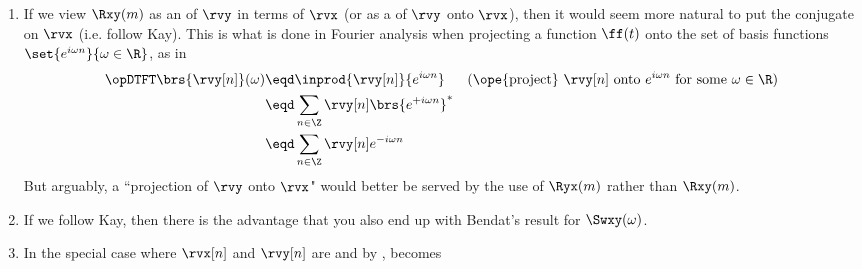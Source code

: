 \begin{remark}
\begin{enumerate}
\item If we view $\Rxy(m)$ as an  of $\rvy$ in terms of $\rvx$ 
      (or as a  of $\rvy$ onto $\rvx$),
      then it would seem more natural to put the conjugate on $\rvx$ (i.e. follow Kay).
      This is what is done in Fourier analysis when projecting a function $\ff(t)$ onto the 
      set of basis functions $\set{e^{i\omega n}}{\omega\in\R}$, as in 
      \\\begin{align*}
        \opDTFT\brs{\rvy[n]}(\omega) 
          &\eqd \inprod{\rvy[n]}{e^{i\omega n}} 
          && \text{(\ope{project} $\rvy[n]$ onto $e^{i\omega n}$ for some $\omega\in\R$)}
        \\&\eqd \sum_{n\in\Z} \rvy[n] \brs{e^{+i\omega n}}^\ast
        \\&\eqd \sum_{n\in\Z} \rvy[n] e^{-i\omega n}
      \end{align*}
      But arguably, a ``projection of $\rvy$ onto $\rvx$" would better be served by the use of $\Ryx(m)$ rather than $\Rxy(m)$.

\item If we follow Kay, then there is the advantage that you also end up with Bendat's result for $\Swxy(\omega)$.

\item In the special case where $\rvx[n]$ and $\rvy[n]$ are  and by 
      ,  becomes
\\
\end{enumerate}
\end{remark}
